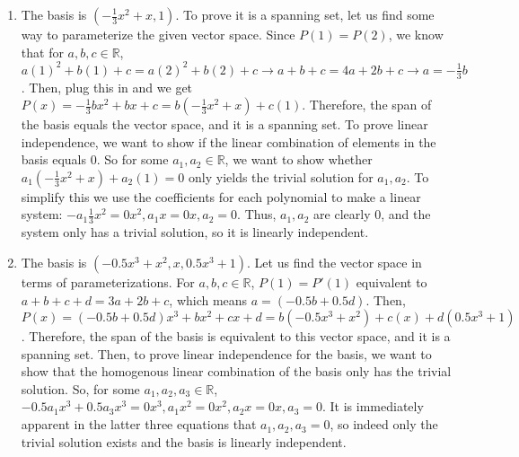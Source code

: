 \documentclass{article}
\begin{document}
\begin{enumerate}
\begin{enumerate}
\item The basis is $(-\frac{1}{3} x^2 + x, 1)$. To prove it is a spanning set, let us find some way to parameterize the given vector space. Since $P(1) = P(2)$, we know that for $a,b,c \in \mathbb{R}$, $a(1)^2 + b(1) +c = a(2)^2 + b(2) + c \rightarrow a + b + c = 4a + 2b + c \rightarrow a = -\frac{1}{3}b$. Then, plug this in and we get $P(x) = -\frac{1}{3}bx^2 + bx + c = b(-\frac{1}{3}x^2 + x) + c(1)$. Therefore, the span of the basis equals the vector space, and it is a spanning set. To prove linear independence, we want to show if the linear combination of elements in the basis equals 0. So for some $a_1, a_2 \in \mathbb{R}$, we want to show whether $a_1 (-\frac{1}{3} x^2 + x) + a_2 (1) = 0$ only yields the trivial solution for $a_1, a_2$. To simplify this we use the coefficients for each polynomial to make a linear system:  $-a_1\frac{1}{3}x^2 = 0x^2, a_1 x = 0x, a_2 = 0$. Thus, $a_1, a_2$ are clearly 0, and the system only has a trivial solution, so it is linearly independent.

\item The basis is $(-0.5x^3 + x^2, x, 0.5x^3 + 1)$. Let us find the vector space in terms of parameterizations. For $a,b,c \in \mathbb{R}$, $P(1) = P'(1)$ equivalent to $a + b + c + d = 3a + 2b + c$, which means $a = (-0.5b + 0.5d)$. Then, $P(x) = (-0.5b + 0.5d)x^3 + bx^2 + cx + d = b(-0.5x^3 + x^2) + c(x) + d(0.5x^3 + 1)$. Therefore, the span of the basis is equivalent to this vector space, and it is a spanning set. Then, to prove linear independence for the basis, we want to show that the homogenous linear combination of the basis only has the trivial solution. So, for some $a_1, a_2, a_3 \in \mathbb{R}$, $-0.5a_1x^3 + 0.5a_3x^3 = 0x^3, a_1x^2 = 0x^2, a_2x = 0x, a_3 = 0$. It is immediately apparent in the latter three equations that $a_1,a_2,a_3 = 0$, so indeed only the trivial solution exists and the basis is linearly independent.


\end{enumerate}
\end{enumerate}
\end{document}
